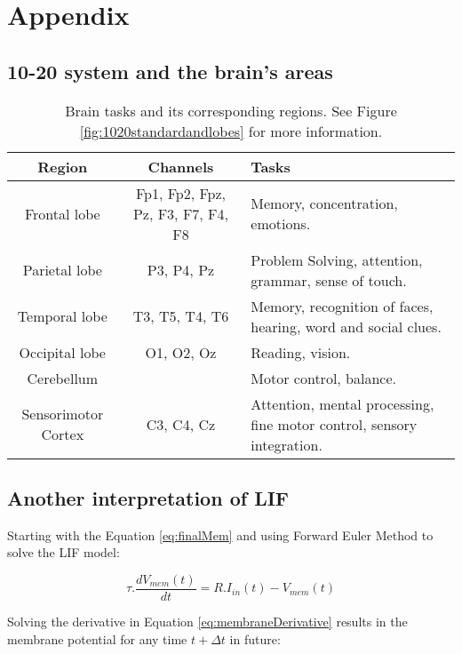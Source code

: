 \onecolumn
\section{Appendix}

	\subsection{10-20 system and the brain's areas}
		\begin{table}[H]
			\begin{center}
				\caption{Brain tasks and its corresponding regions. See Figure \ref{fig:1020standardandlobes} for more information.}
				\begin{tabular}{|c|c|p{}|}
					\hline
					Region & Channels & Tasks\\
					\hline
					Frontal lobe & Fp1, Fp2, Fpz, Pz, F3, F7, F4, F8 & Memory, concentration, emotions.\\
					\hline
					Parietal lobe& P3, P4, Pz & Problem Solving, attention, grammar, sense of touch. \\
					\hline
					Temporal lobe& T3, T5, T4, T6 & Memory, recognition of faces, hearing, word and social clues. \\
					\hline
					Occipital lobe & O1, O2, Oz & Reading, vision.\\
					\hline
					Cerebellum && Motor control, balance. \\
					\hline
					Sensorimotor Cortex & C3, C4, Cz& Attention, mental processing, ﬁne motor control, sensory integration. \\
					\hline
				\end{tabular}
				\label{tb:brainRegions}
			\end{center}
		\end{table}

	\subsection{Another interpretation of LIF}
		
		\par Starting with the Equation \ref{eq:finalMem} and using Forward Euler Method to solve the LIF model:
		
		\begin{equation}
			\tau.\dfrac{dV_{mem}(t)}{dt} = R.I_{in}(t) - V_{mem}(t)
		\end{equation}
		
		\par Solving the derivative in Equation \ref{eq:membraneDerivative} results in the membrane potential for any time $t+\Delta t$ in future:
		
